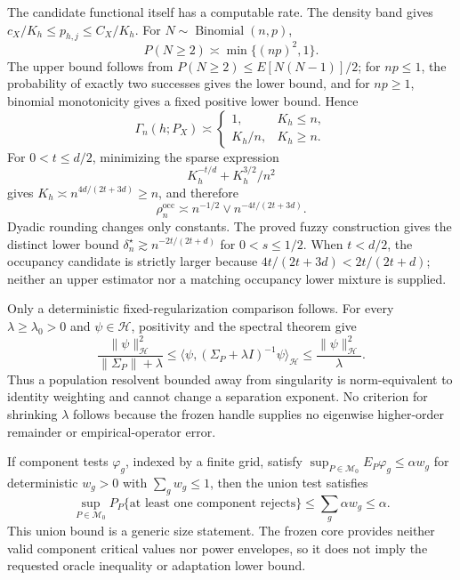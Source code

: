 The candidate functional itself has a computable rate. The density band gives \(c_X/K_h\le p_{h,j}\le C_X/K_h\). For \(N\sim\operatorname{Binomial}(n,p)\),
\[
P(N\ge2)\asymp\min\{(np)^2,1\}.
\]
The upper bound follows from \(P(N\ge2)\le E[N(N-1)]/2\); for \(np\le1\), the probability of exactly two successes gives the lower bound, and for \(np\ge1\), binomial monotonicity gives a fixed positive lower bound. Hence
\[
\Gamma_n(h;P_X)\asymp
\begin{cases}
1,&K_h\le n,\\
K_h/n,&K_h\ge n.
\end{cases}
\]
For \(0<t\le d/2\), minimizing the sparse expression
\[
K_h^{-t/d}+K_h^{3/2}/n^2
\]
gives \(K_h\asymp n^{4d/(2t+3d)}\ge n\), and therefore
\[
\rho_n^{\mathrm{occ}}\asymp n^{-1/2}\vee n^{-4t/(2t+3d)}.
\]
Dyadic rounding changes only constants. The proved fuzzy construction gives the distinct lower bound \(\delta_n^\star\gtrsim n^{-2t/(2t+d)}\) for \(0<s\le1/2\). When \(t<d/2\), the occupancy candidate is strictly larger because \(4t/(2t+3d)<2t/(2t+d)\); neither an upper estimator nor a matching occupancy lower mixture is supplied.

Only a deterministic fixed-regularization comparison follows. For every \(\lambda\ge\lambda_0>0\) and \(\psi\in\mathcal H\), positivity and the spectral theorem give
\[
\frac{\|\psi\|_{\mathcal H}^2}{\|\Sigma_P\|+\lambda}
\le\langle\psi,(\Sigma_P+\lambda I)^{-1}\psi\rangle_{\mathcal H}
\le\frac{\|\psi\|_{\mathcal H}^2}{\lambda}.
\]
Thus a population resolvent bounded away from singularity is norm-equivalent to identity weighting and cannot change a separation exponent. No criterion for shrinking \(\lambda\) follows because the frozen handle supplies no eigenwise higher-order remainder or empirical-operator error.

If component tests \(\varphi_g\), indexed by a finite grid, satisfy
\(\sup_{P\in\mathcal M_0}E_P\varphi_g\le\alpha w_g\) for deterministic \(w_g>0\) with \(\sum_gw_g\le1\), then the union test satisfies
\[
\sup_{P\in\mathcal M_0}
P_P\{\text{at least one component rejects}\}
\le\sum_g\alpha w_g\le\alpha.
\]
This union bound is a generic size statement. The frozen core provides neither valid component critical values nor power envelopes, so it does not imply the requested oracle inequality or adaptation lower bound.
